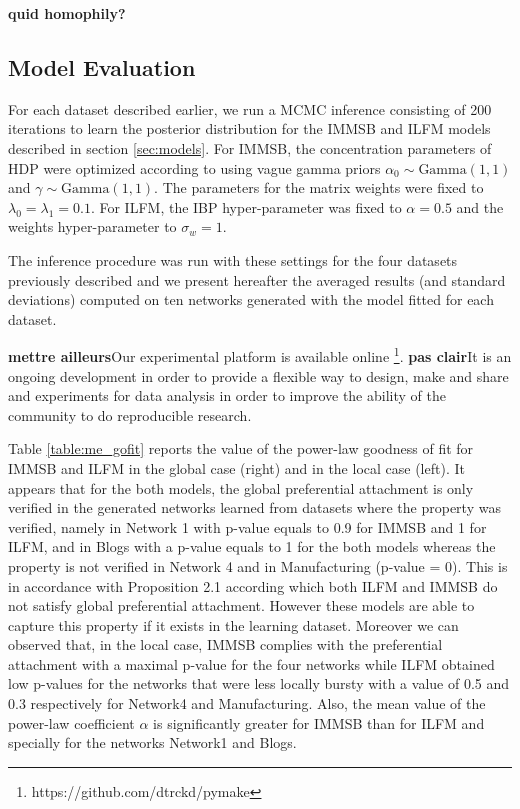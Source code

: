 \textbf{quid homophily?}






\subsection{Model Evaluation}
For each dataset described earlier, we run a MCMC inference consisting of 200 iterations to learn the posterior distribution for the IMMSB and ILFM  models described in section \ref{sec:models}. For IMMSB, the concentration parameters of HDP were optimized according to \cite{HDP} using vague gamma priors $\alpha_0 \sim \text{Gamma}(1,1)$ and $\gamma \sim \text{Gamma}(1,1)$. The parameters for the matrix weights were fixed to $\lambda_0=\lambda_1=0.1$. For ILFM, the IBP hyper-parameter was fixed to $\alpha=0.5$ and the weights hyper-parameter to $\sigma_w = 1$. 

The inference procedure was run with these settings for the four datasets previously described and we present hereafter the averaged results (and standard deviations) computed on ten networks generated with the model fitted for each dataset.

\textbf{mettre ailleurs}Our experimental platform is available online \footnote{https://github.com/dtrckd/pymake}. \textbf{pas clair}It is an ongoing development in order to provide a flexible way to design, make and share and experiments for data analysis in order to improve the ability of the community to do reproducible research.

Table \ref{table:me_gofit} reports the value of the power-law goodness of fit for IMMSB and ILFM in the global case (right) and in the local case (left). It appears that for the both models, the global preferential attachment is only verified in the generated networks learned from datasets where the property was verified, namely in Network 1 with p-value equals to 0.9 for IMMSB and 1 for ILFM, and in Blogs with a p-value equals to 1 for the both models whereas the property is not verified in Network 4 and in Manufacturing (p-value = 0). This is in accordance with Proposition 2.1  according which both ILFM and IMMSB do not satisfy global preferential attachment. However these models are able to capture this property if it exists in the learning dataset.  Moreover we can observed that, in the local case, IMMSB complies with the preferential attachment with a maximal p-value for the four networks while ILFM obtained low p-values for the networks that were less locally bursty with a value of 0.5 and 0.3 respectively for Network4 and Manufacturing. Also, the mean value of the power-law coefficient $\alpha$ is significantly greater for IMMSB than for ILFM and specially for the networks Network1 and Blogs.


